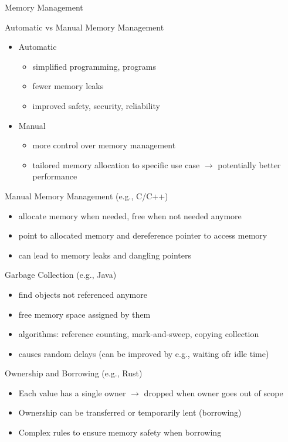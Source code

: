 \begin{frame}[b]{Memory Management}
	\vspace{-10mm}
	\begin{fancycolumns}[b]
		\begin{motivation}{Automatic vs Manual Memory Management}
			\begin{itemize}
				\item Automatic
				      \begin{itemize}
					      \item simplified programming, programs
					      \item fewer memory leaks
					      \item improved safety, security, reliability
				      \end{itemize}
				\item Manual
				      \begin{itemize}
					      \item more control over memory management
					      \item tailored memory allocation to specific use case $\rightarrow$ potentially better performance
				      \end{itemize}
			\end{itemize}
		\end{motivation}
		\begin{definition}{Manual Memory Management (e.g., C/C++)}
			\begin{itemize}
				\item allocate memory when needed, free when not needed anymore
				\item point to allocated memory and dereference pointer to access memory
				\item can lead to memory leaks and dangling pointers
			\end{itemize}
		\end{definition}
		\nextcolumn
		\begin{definition}{Garbage Collection (e.g., Java)}
			\begin{itemize}
				\item find objects not referenced anymore
				\item free memory space assigned by them
				\item algorithms: reference counting, mark-and-sweep, copying collection
				\item causes random delays (can be improved by e.g., waiting ofr idle time)
			\end{itemize}
		\end{definition}
		\begin{example}{Ownership and Borrowing (e.g., Rust)}
			\begin{itemize}
				\item Each value has a single owner $\rightarrow$ dropped when owner goes out of scope
				\item Ownership can be transferred or temporarily lent (borrowing)
				\item Complex rules to ensure memory safety when borrowing
			\end{itemize}
		\end{example}
	\end{fancycolumns}
\end{frame}
